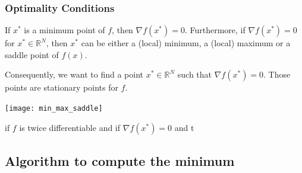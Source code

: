 \documentclass{article}
\begin{document}
\subsubsection{Optimality Conditions}
\begin{definition}
    If $x^*$ is a minimum point of $f$, then $\nabla f(x^*)=0$. Furthermore,
    if $\nabla f(x^*)=0$ for $x^*\in \mathbb{R}^N$, then $x^*$ can be either a
    (local) minimum, a (local) maximum or a saddle point of $f(x)$.
\end{definition}
Consequently, we want to find a point $x^*\in \mathbb{R}^N$ such that $\nabla
f(x^*)=0$. Those points are stationary points for $f$.
\begin{center}
    \texttt{[image: min\_max\_saddle]}
\end{center}
\begin{definition}
    if $f$ is twice differentiable and if $\nabla f(x^*)=0$ and t
    
\end{definition}
\subsection{Algorithm to compute the minimum}
\end{document}
